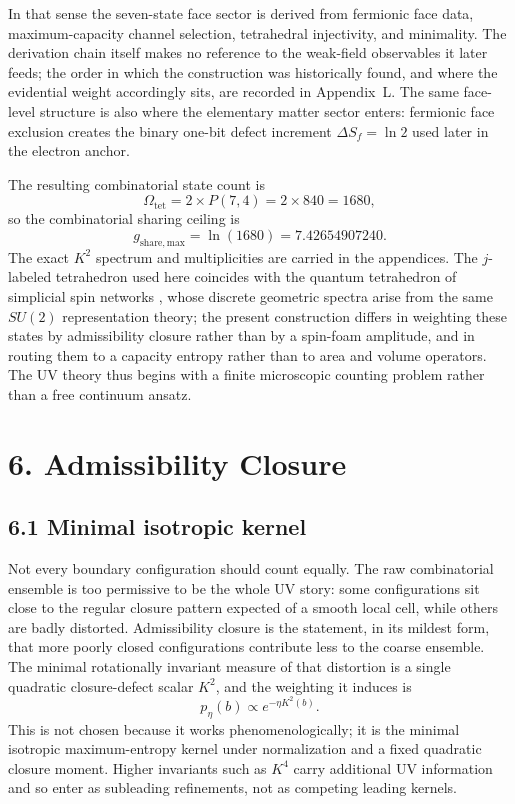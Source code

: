 \documentclass[11pt]{article}
\begin{document}
In that sense the seven-state face sector is derived from fermionic face data, maximum-capacity channel selection, tetrahedral injectivity, and minimality. The derivation chain itself makes no reference to the weak-field observables it later feeds; the order in which the construction was historically found, and where the evidential weight accordingly sits, are recorded in Appendix~L. The same face-level structure is also where the elementary matter sector enters: fermionic face exclusion creates the binary one-bit defect increment $\Delta S_f=\ln 2$ used later in the electron anchor.

The resulting combinatorial state count is
\[
\Omega_{\mathrm{tet}}=2\times P(7,4)=2\times 840=1680,
\]
so the combinatorial sharing ceiling is
\[
g_{\mathrm{share,max}}=\ln(1680)=7.42654907240.
\]
The exact $K^2$ spectrum and multiplicities are carried in the appendices. The $j$-labeled tetrahedron used here coincides with the quantum tetrahedron of simplicial spin networks \citep{Barbieri1998,BaezBarrett1999}, whose discrete geometric spectra \citep{RovelliSmolin1995} arise from the same $SU(2)$ representation theory; the present construction differs in weighting these states by admissibility closure rather than by a spin-foam amplitude, and in routing them to a capacity entropy rather than to area and volume operators. The UV theory thus begins with a finite microscopic counting problem rather than a free continuum ansatz.

\section{6. Admissibility Closure}

\subsection{6.1 Minimal isotropic kernel}

Not every boundary configuration should count equally. The raw combinatorial ensemble is too permissive to be the whole UV story: some configurations sit close to the regular closure pattern expected of a smooth local cell, while others are badly distorted. Admissibility closure is the statement, in its mildest form, that more poorly closed configurations contribute less to the coarse ensemble. The minimal rotationally invariant measure of that distortion is a single quadratic closure-defect scalar $K^2$, and the weighting it induces is
\[
p_\eta(b)\propto e^{-\eta K^2(b)}.
\]
This is not chosen because it works phenomenologically; it is the minimal isotropic maximum-entropy kernel under normalization and a fixed quadratic closure moment. Higher invariants such as $K^4$ carry additional UV information and so enter as subleading refinements, not as competing leading kernels.
\end{document}

